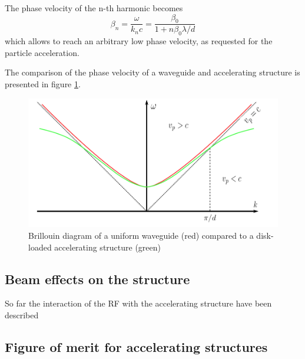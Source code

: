 The phase velocity of the n-th harmonic becomes
\begin{equation}
\beta_n = \frac{\omega}{k_n c} = \frac{\beta_0}{1+n\beta_0 \lambda/d}
\end{equation}
which allows to reach an arbitrary low phase velocity, as requested for the particle acceleration.

The comparison of the phase velocity of a waveguide and accelerating structure is presented in figure \ref{vp_fig}.



\begin{figure}[h]
\centering

\includegraphics[scale=0.4]{pictures/vp}
\caption{Brillouin diagram of a uniform waveguide (red) compared to a disk-loaded accelerating structure (green) \cite{Kovermann:1330346}}
\label{vp_fig}

\end{figure}


\subsection[Beam effect on the structure]{Beam effects on the structure}

So far the interaction of the RF with the accelerating structure have been described 





\subsection[Figure of merit for accelerating structures]{Figure of merit for accelerating structures}

